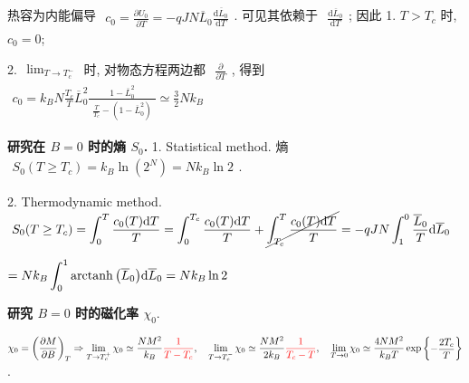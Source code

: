 \documentclass[../../main.tex]{subfiles}
\begin{document}
热容为内能偏导 $\begin{aligned}
    c_{0} = \frac{\partial U_{0}}{\partial T} = -qJN\overline{L}_{0}\frac{\mathrm{d}\overline{L}_{0}}{\mathrm{d}T}
\end{aligned}$. 可见其依赖于 $\begin{aligned}
    \frac{\mathrm{d}\overline{L}_{0}}{\mathrm{d}T}
\end{aligned}$; 因此 1. $T>T_{c}$ 时,  $c_{0} = 0$; 

2. $\begin{aligned}
    \lim_{T\rightarrow T_{c}^{-}}
\end{aligned}$ 时, 对物态方程两边都 $\begin{aligned}
    \frac{\partial}{\partial T}
\end{aligned}$, 得到 $\begin{aligned}
    c_{0} = k_{B}N\frac{T_{c}}{T}\overline{L}_{0}^{2}\frac{1 - \overline{L}_{0}^{2}}{\begin{aligned}
        \frac{T}{T_{c}} - \left(1 - \overline{L}_{0}^{2}\right)
    \end{aligned}} \simeq \frac{3}{2}Nk_{B}
\end{aligned}$

\textbf{研究在 $B=0$ 时的熵 $S_{0}$.} 1. Statistical method. 熵 $\begin{aligned}
    S_{0}(T\geq T_{c}) = k_{B}\ln{(2^{N})} = Nk_{B}\ln{2}
\end{aligned}$. 

2. Thermodynamic method. $\begin{aligned}
    \text{ }S_{0}(T\geq T_{c}) &= \int_{0}^{T}\frac{c_{0}(T)\mathrm{d}T}{T} = \int_{0}^{T_{c}}\frac{c_{0}(T)\mathrm{d}T}{T} + \cancel{\int_{T_{c}}^{T}\frac{c_{0}(T)\mathrm{d}T}{T}} = -qJN\int_{1}^{0}\frac{\overline{L}_{0}}{T}\mathrm{d}\overline{L}_{0}\end{aligned}$

$\begin{aligned}
    = Nk_{B}\int_{0}^{1}\operatorname{arctanh}{\left(\overline{L}_{0}\right)}\mathrm{d}\overline{L}_{0} = Nk_{B}\ln{2}
\end{aligned}$

\textbf{研究 $B=0$ 时的磁化率 $\chi_{0}$}. 

$\begin{aligned}
    \chi_{0} = \left(\frac{\partial M}{\partial B}\right)_{T}\Rightarrow
    \lim_{T\rightarrow T_{c}^{+}}\chi_{0} \simeq \frac{NM^{2}}{k_{B}}{\color{red}{\frac{1}{T-T_{c}}}},\quad 
    \lim_{T\rightarrow T_{c}^{-}}\chi_{0} \simeq \frac{NM^{2}}{2k_{B}}{\color{red}{\frac{1}{T_{c}-T}}},\quad
    \lim_{T\rightarrow 0}\chi_{0}\simeq \frac{4NM^{2}}{k_{B}T}\exp\left\{\begin{aligned}
        -\frac{2T_{c}}{T}
    \end{aligned}\right\}
\end{aligned}$. 
\end{document}
